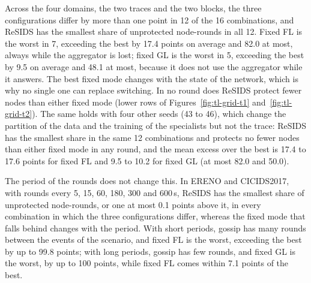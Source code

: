 Across the four domains, the two traces and the two blocks, the three configurations differ by more than one point in 12 of the 16 combinations, and ReSIDS has the smallest share of unprotected node-rounds in all 12. Fixed FL is the worst in 7, exceeding the best by 17.4 points on average and 82.0 at most, always while the aggregator is lost; fixed GL is the worst in 5, exceeding the best by 9.5 on average and 48.1 at most, because it does not use the aggregator while it answers. The best fixed mode changes with the state of the network, which is why no single one can replace switching. In no round does ReSIDS protect fewer nodes than either fixed mode (lower rows of Figures~\ref{fig:tl-grid-t1} and~\ref{fig:tl-grid-t2}). The same holds with four other seeds (43 to 46), which change the partition of the data and the training of the specialists but not the trace: ReSIDS has the smallest share in the same 12 combinations and protects no fewer nodes than either fixed mode in any round, and the mean excess over the best is 17.4 to 17.6 points for fixed FL and 9.5 to 10.2 for fixed GL (at most 82.0 and 50.0).

The period of the rounds does not change this. In ERENO and CICIDS2017, with rounds every 5, 15, 60, 180, 300 and 600\,s, ReSIDS has the smallest share of unprotected node-rounds, or one at most 0.1 points above it, in every combination in which the three configurations differ, whereas the fixed mode that falls behind changes with the period. With short periods, gossip has many rounds between the events of the scenario, and fixed FL is the worst, exceeding the best by up to 99.8 points; with long periods, gossip has few rounds, and fixed GL is the worst, by up to 100 points, while fixed FL comes within 7.1 points of the best.

